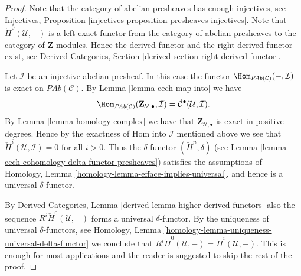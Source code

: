 \begin{proof}
Note that the category of abelian presheaves has enough injectives, see
Injectives, Proposition \ref{injectives-proposition-presheaves-injectives}.
Note that $\check{H}^0(\mathcal{U}, -)$ is a left exact functor
from the category of abelian presheaves
to the category of $\mathbf{Z}$-modules.
Hence the derived functor and the right derived functor exist, see
Derived Categories, Section \ref{derived-section-right-derived-functor}.

\medskip\noindent
Let $\mathcal{I}$ be an injective abelian presheaf.
In this case the functor
$\Hom_{\textit{PAb}(\mathcal{C})}(-, \mathcal{I})$
is exact on $\textit{PAb}(\mathcal{C})$. By
Lemma \ref{lemma-cech-map-into} we have
$$
\Hom_{\textit{PAb}(\mathcal{C})}(
\mathbf{Z}_{\mathcal{U}, \bullet}, \mathcal{I})
=
\check{\mathcal{C}}^\bullet(\mathcal{U}, \mathcal{I}).
$$
By Lemma \ref{lemma-homology-complex} we have that
$\mathbf{Z}_{\mathcal{U}, \bullet}$ is exact in positive degrees.
Hence by the exactness of Hom into $\mathcal{I}$ mentioned above we see
that $\check{H}^i(\mathcal{U}, \mathcal{I}) = 0$ for all
$i > 0$. Thus the $\delta$-functor $(\check{H}^n, \delta)$
(see Lemma \ref{lemma-cech-cohomology-delta-functor-presheaves})
satisfies the assumptions of
Homology, Lemma \ref{homology-lemma-efface-implies-universal},
and hence is a universal $\delta$-functor.

\medskip\noindent
By
Derived Categories, Lemma \ref{derived-lemma-higher-derived-functors}
also the sequence $R^i\check{H}^0(\mathcal{U}, -)$
forms a universal $\delta$-functor. By the uniqueness of universal
$\delta$-functors, see
Homology, Lemma \ref{homology-lemma-uniqueness-universal-delta-functor}
we conclude that
$R^i\check{H}^0(\mathcal{U}, -) = \check{H}^i(\mathcal{U}, -)$.
This is enough for most applications
and the reader is suggested to skip the rest of the proof.


\end{proof}
